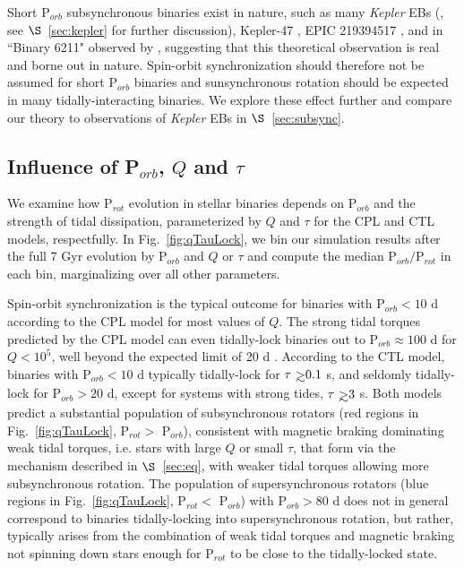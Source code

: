 \documentclass[twocolumn]{aastex61}
\def\gsim{~\rlap{$>$}{\lower 1.0ex\hbox{$\sim$}}}
\newcommand{\kepler}[0]{\textit{Kepler}\xspace}
\begin{document}
Short P$_{orb}$ subsynchronous binaries exist in nature, such as many \kepler EBs (\citet{Lurie2017}, see $\S$~\ref{sec:kepler} for further discussion), Kepler-47 \citep{Orosz2012}, EPIC 219394517 \citep{Torres2018}, and in ``Binary 6211" observed by \citet{Meibom2006}, suggesting that this theoretical observation is real and borne out in nature. Spin-orbit synchronization should therefore not be assumed for short P$_{orb}$ binaries and sunsynchronous rotation should be expected in many tidally-interacting binaries.  We explore these effect further and compare our theory to observations of \kepler EBs in $\S$~\ref{sec:subsync}.

\subsection{Influence of P$_{orb}$, $Q$ and $\tau$} \label{sec:qTauMaps}

We examine how P$_{rot}$ evolution in stellar binaries depends on P$_{orb}$ and the strength of tidal dissipation, parameterized by $Q$ and $\tau$ for the CPL and CTL models, respectfully. In Fig.~\ref{fig:qTauLock}, we bin our simulation results after the full 7 Gyr evolution by P$_{orb}$ and $Q$ or $\tau$ and compute the median P$_{orb}/$P$_{rot}$ in each bin, marginalizing over all other parameters.

Spin-orbit synchronization is the typical outcome for binaries with P$_{orb} < 10$ d according to the CPL model for most values of $Q$. The strong tidal torques predicted by the CPL model can even tidally-lock binaries out to P$_{orb} \approx 100 $ d for $Q < 10^5$, well beyond the expected limit of 20 d \citep{Meibom2006}.  According to the CTL model, binaries with P$_{orb} < 10$ d typically tidally-lock for $\tau \gsim 0.1$ s, and seldomly tidally-lock for P$_{orb} > 20$ d, except for systems with strong tides, $\tau \gsim 3$ s.  Both models predict a substantial population of subsynchronous rotators (red regions in Fig.~\ref{fig:qTauLock}, P$_{rot} >$ P$_{orb}$), consistent with magnetic braking dominating weak tidal torques, i.e. stars with large $Q$ or small $\tau$, that form via the mechanism described in $\S$~\ref{sec:eq}, with weaker tidal torques allowing more subsynchronous rotation.  The population of supersynchronous rotators (blue regions in Fig.~\ref{fig:qTauLock}, P$_{rot} <$ P$_{orb}$) with P$_{orb} > 80$ d does not in general correspond to binaries tidally-locking into supersynchronous rotation, but rather, typically arises from the combination of weak tidal torques and magnetic braking not spinning down stars enough for P$_{rot}$ to be close to the tidally-locked state.  
\end{document}
